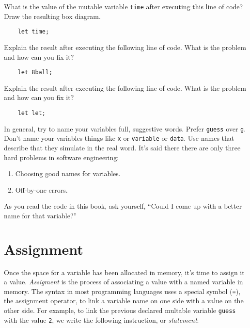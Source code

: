\begin{question}
What is the value of the mutable variable \texttt{time} after executing this
line of code? Draw the resulting box diagram.
  \begin{lstlisting}
    let time;
  \end{lstlisting}
\end{question}

\begin{question}
Explain the result after executing the following line of code. What is the
problem and how can you fix it?
  \begin{lstlisting}
    let 8ball;
  \end{lstlisting}
\end{question}

\begin{question}
Explain the result after executing the following line of code. What is the
problem and how can you fix it?
  \begin{lstlisting}
    let let;
  \end{lstlisting}
\end{question}

In general, try to name your variables full, suggestive words. Prefer
\texttt{guess} over \texttt{g}. Don't name your variables things like \texttt{x}
or \texttt{variable} or \texttt{data}. Use names that describe that they
simulate in the real word. It's said there there are only three hard problems in
software engineering:

\begin{enumerate}
  \item Choosing good names for variables.
  \item Off-by-one errors.
\end{enumerate}

As you read the code in this book, ask yourself, ``Could I come up with a better
name for that variable?''

\section{Assignment}
Once the space for a variable has been allocated in memory, it's time to assign
it a value. \emph{Assigment} is the process of associating a value with a named
variable in memory. The syntax in most programming languages uses a special
symbol (\texttt{=}), the assignment operator, to link a variable name on one
side with a value on the other side.  For example, to link the previous declared multable variable
\texttt{guess} with the value \texttt{2}, we write the following instruction, or
\emph{statement}:

